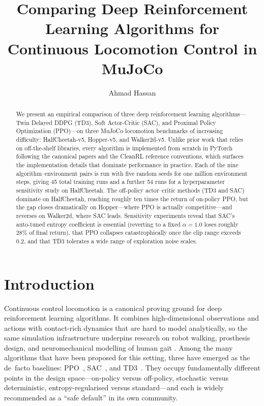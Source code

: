 \documentclass[letterpaper]{article}
\title{Comparing Deep Reinforcement Learning Algorithms for Continuous Locomotion Control in MuJoCo}
\author{
    Ahmad Hassan
}
\begin{document}
\maketitle

\begin{abstract}
\noindent
We present an empirical comparison of three deep reinforcement learning
algorithms---Twin Delayed DDPG (TD3), Soft Actor-Critic (SAC), and Proximal
Policy Optimization (PPO)---on three MuJoCo locomotion benchmarks of
increasing difficulty: HalfCheetah-v5, Hopper-v5, and Walker2d-v5. Unlike
prior work that relies on off-the-shelf libraries, every algorithm is
implemented from scratch in PyTorch following the canonical papers and the
CleanRL reference conventions, which surfaces the implementation details
that dominate performance in practice. Each of the nine algorithm--environment
pairs is run with five random seeds for one million environment steps,
giving 45 total training runs and a further 54 runs for a hyperparameter
sensitivity study on HalfCheetah. The off-policy actor--critic methods
(TD3 and SAC) dominate on HalfCheetah, reaching roughly ten times the
return of on-policy PPO, but the gap closes dramatically on Hopper---where
PPO is actually competitive---and reverses on Walker2d, where SAC leads.
Sensitivity experiments reveal that SAC's auto-tuned entropy coefficient is
essential (reverting to a fixed $\alpha=1.0$ loses roughly 28\% of final
return), that PPO collapses catastrophically once the clip range exceeds
0.2, and that TD3 tolerates a wide range of exploration noise scales.
\end{abstract}

\section{Introduction}

Continuous control locomotion is a canonical proving ground for deep
reinforcement learning algorithms. It combines high-dimensional observations
and actions with contact-rich dynamics that are hard to model analytically,
so the same simulation infrastructure underpins research on robot walking,
prosthesis design, and neuromechanical modelling of human gait
\citep{song2021neuromech}. Among the many algorithms that have been proposed
for this setting, three have emerged as the de~facto baselines:
PPO~\citep{schulman2017ppo}, SAC~\citep{haarnoja2018sac}, and
TD3~\citep{fujimoto2018td3}. They occupy fundamentally different points in
the design space---on-policy versus off-policy, stochastic versus
deterministic, entropy-regularised versus standard---and each is widely
recommended as a ``safe default'' in its own community.
\end{document}
